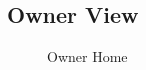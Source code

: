 \subsection{Owner View}
\begin{figure}[H]
	\begin{center}
		\caption{Owner Home}
	\end{center}
\end{figure}
\newpage
